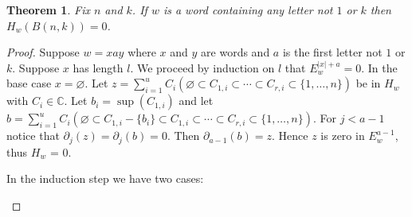 \documentclass{article}
\newtheorem{theorem}{Theorem}[section]
\newcommand{\C}{\mathbb{C}}
\begin{document}
  \begin{theorem} Fix $n$ and $k$. If $w$ is a word containing any letter not $1$ or $k$ then 
    $H_w(B(n, k)) = 0$.
  \end{theorem}
  \begin{proof} Suppose $w = xay$ where $x$ and $y$ are words and $a$ is the first letter not 
    $1$ or $k$.
    Suppose $x$ has length $l$. We proceed by induction on $l$ that $E^{|x|+a}_w = 0$. 
    In the base case $x = \varnothing$. Let $z = \sum_{i=1}^u C_i (\varnothing \subset C_{1,i} 
    \subset \cdots \subset C_{r,i} \subset \{1, \ldots, n\})$ be in $H_w$ with $C_i \in \C$. Let 
    $b_i =\sup(C_{1,i})$
    and let $b = \sum_{i=1}^u C_i (\varnothing \subset C_{1,i}-\{b_i\} \subset C_{1,i} \subset 
    \cdots \subset C_{r,i} \subset \{1, \ldots, n\})$. For $j < a-1$ notice that 
    $\partial_j(z)=\partial_j(b) = 0$. Then $\partial_{a-1}(b) = z$. Hence $z$ is zero in 
    $E^{a-1}_w$, thus $H_w$ = 0.

    In the induction step we have two cases:
    \begin{enumerate}
      

\end{enumerate}
\end{proof}
\end{document}
